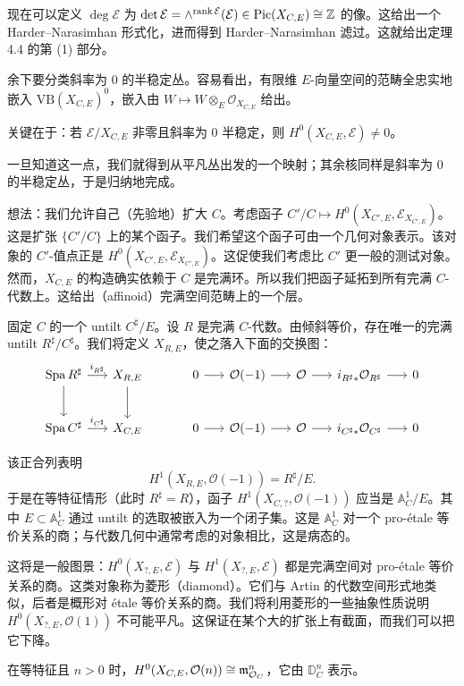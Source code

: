 现在可以定义 $\deg\mathcal{E}$ 为 $\det\mathcal{E}=\wedge^{\operatorname{rank}\mathcal{E}}(\mathcal{E})\in\operatorname{Pic}(X_{C,E})\cong\mathbb{Z}$ 的像。这给出一个 Harder--Narasimhan 形式化，进而得到 Harder--Narasimhan 滤过。这就给出定理 4.4 的第 (1) 部分。

余下要分类斜率为 $0$ 的半稳定丛。容易看出，有限维 $E$-向量空间的范畴全忠实地嵌入 $\mathrm{VB}(X_{C,E})^0$，嵌入由 $W\mapsto W\otimes_E\mathcal{O}_{X_{C,E}}$ 给出。

关键在于：若 $\mathcal{E}/X_{C,E}$ 非零且斜率为 $0$ 半稳定，则 $H^0(X_{C,E},\mathcal{E})\neq0$。

一旦知道这一点，我们就得到从平凡丛出发的一个映射；其余核同样是斜率为 $0$ 的半稳定丛，于是归纳地完成。

想法：我们允许自己（先验地）扩大 $C$。考虑函子 $C'/C\mapsto H^0(X_{C',E},\mathcal{E}_{X_{C',E}})$。这是扩张 $\{C'/C\}$ 上的某个函子。我们希望这个函子可由一个几何对象表示。该对象的 $C'$-值点正是 $H^0(X_{C',E},\mathcal{E}_{X_{C',E}})$。这促使我们考虑比 $C'$ 更一般的测试对象。然而，$X_{C,E}$ 的构造确实依赖于 $C$ 是完满环。所以我们把函子延拓到所有完满 $C$-代数上。这给出（affinoid）完满空间范畴上的一个层。

\begin{example}
固定 $C$ 的一个 untilt $C^{\sharp}/E$。设 $R$ 是完满 $C$-代数。由倾斜等价，存在唯一的完满 untilt $R^{\sharp}/C^{\sharp}$。我们将定义 $X_{R,E}$，使之落入下面的交换图：
\[
\begin{tikzcd}[column sep=1.6em, row sep=2.4em]
\mathrm{Spa}\,R^{\sharp}\arrow[r,"i_{R^{\sharp}}"]\arrow[d]
 & X_{R,E}\arrow[d]
 & & 0\arrow[r] & \mathcal{O}(-1)\arrow[r] & \mathcal{O}\arrow[r]
 & i_{R^{\sharp}*}\mathcal{O}_{R^{\sharp}}\arrow[r] & 0\\
\mathrm{Spa}\,C^{\sharp}\arrow[r,"i_{C^{\sharp}}"]
 & X_{C,E}
 & & 0\arrow[r] & \mathcal{O}(-1)\arrow[r] & \mathcal{O}\arrow[r]
 & i_{C^{\sharp}*}\mathcal{O}_{C^{\sharp}}\arrow[r] & 0
\end{tikzcd}
\]

该正合列表明
\[
H^1(X_{R,E},\mathcal{O}(-1))=R^{\sharp}/E.
\]
于是在等特征情形（此时 $R^{\sharp}=R$），函子 $H^1(X_{C,?},\mathcal{O}(-1))$ 应当是 $\mathbb{A}^1_C/E$。其中 $E\subset\mathbb{A}^1_C$ 通过 untilt 的选取被嵌入为一个闭子集。这是 $\mathbb{A}^1_C$ 对一个 pro-étale 等价关系的商；与代数几何中通常考虑的对象相比，这是病态的。

这将是一般图景：$H^0(X_{?,E},\mathcal{E})$ 与 $H^1(X_{?,E},\mathcal{E})$ 都是完满空间对 pro-étale 等价关系的商。这类对象称为菱形（diamond）。它们与 Artin 的代数空间形式地类似，后者是概形对 étale 等价关系的商。我们将利用菱形的一些抽象性质说明 $H^0(X_{?,E},\mathcal{O}(1))$ 不可能平凡。这保证在某个大的扩张上有截面，而我们可以把它下降。
\end{example}

\begin{example}
在等特征且 $n>0$ 时，$H^0(X_{C,E},\mathcal{O}(n))\cong\mathfrak{m}_{\mathcal{O}_C}^{n}$，它由 $\mathbb{D}^n_C$ 表示。
\end{example}
